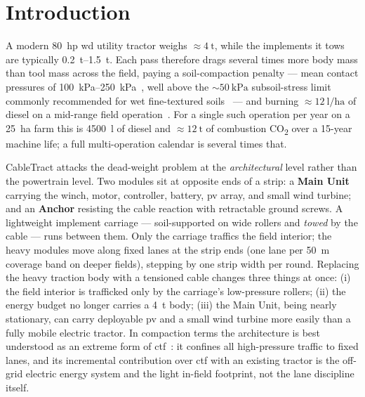 \documentclass[11pt,a4paper]{article}
\begin{document}
\tableofcontents

\glsresetall

\section{Introduction}\label{sec:intro}

A modern \SI{80}{hp} \gls{wd} utility tractor weighs ${\approx}\SI{4}{\tonne}$, while the implements it tows are typically \SIrange{0.2}{1.5}{\tonne}. Each pass therefore drags several times more body mass than tool mass across the field, paying a soil-compaction penalty --- mean contact pressures of \SIrange{100}{250}{\kilo\pascal}~\cite{keller2010compaction}, well above the ${\sim}\SI{50}{\kilo\pascal}$ subsoil-stress limit commonly recommended for wet fine-textured soils~\cite{schjonning2012rules} --- and burning ${\approx}\SI{12}{\litre\per\hectare}$ of diesel on a mid-range field operation~\cite{siemens1999machinery,asabe-d497}. For a single such operation per year on a \SI{25}{\hectare} farm this is \SI{4500}{\litre} of diesel and ${\approx}\SI{12}{\tonne}$ of combustion CO\textsubscript{2} over a 15-year machine life; a full multi-operation calendar is several times that.

CableTract attacks the dead-weight problem at the \emph{architectural} level rather than the powertrain level. Two modules sit at opposite ends of a strip: a \textbf{Main Unit} carrying the winch, motor, controller, battery, \gls{pv} array, and small wind turbine; and an \textbf{Anchor} resisting the cable reaction with retractable ground screws. A lightweight implement carriage --- soil-supported on wide rollers and \emph{towed} by the cable --- runs between them. Only the carriage traffics the field interior; the heavy modules move along fixed lanes at the strip ends (one lane per \SI{50}{\meter} coverage band on deeper fields), stepping by one strip width per round. Replacing the heavy traction body with a tensioned cable changes three things at once: (i) the field interior is trafficked only by the carriage's low-pressure rollers; (ii) the energy budget no longer carries a \SI{4}{\tonne} body; (iii) the Main Unit, being nearly stationary, can carry deployable \gls{pv} and a small wind turbine more easily than a fully mobile electric tractor. In compaction terms the architecture is best understood as an extreme form of \gls{ctf}~\cite{tullberg2007ctf,chamen2015mitigating}: it confines all high-pressure traffic to fixed lanes, and its incremental contribution over \gls{ctf} with an existing tractor is the off-grid electric energy system and the light in-field footprint, not the lane discipline itself.
\end{document}
